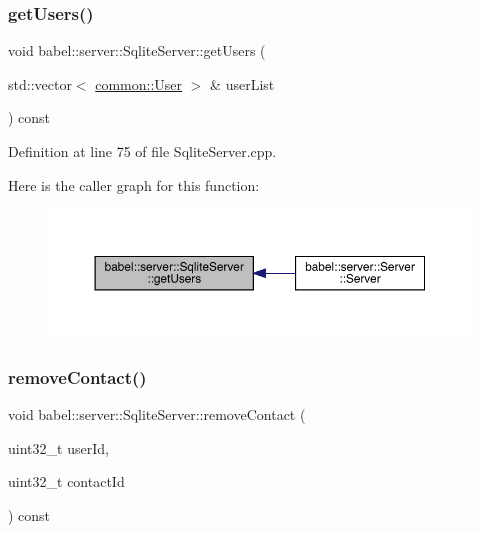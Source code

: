 \subsubsection{\texorpdfstring{get\+Users()}{getUsers()}}
{\footnotesize\ttfamily void babel\+::server\+::\+Sqlite\+Server\+::get\+Users (\begin{DoxyParamCaption}\item[{std\+::vector$<$ \mbox{\hyperlink{classbabel_1_1common_1_1_user}{common\+::\+User}} $>$ \&}]{user\+List }\end{DoxyParamCaption}) const}



Definition at line 75 of file Sqlite\+Server.\+cpp.

Here is the caller graph for this function\+:\nopagebreak
\begin{figure}[H]
\begin{center}
\leavevmode
\includegraphics[width=350pt]{classbabel_1_1server_1_1_sqlite_server_ac0e58c4ae276fc3c52b7205a5098a75c_icgraph}
\end{center}
\end{figure}
\mbox{\label{classbabel_1_1server_1_1_sqlite_server_a526fe31d577c1227af6ed92ee6f65bd6}} 
\subsubsection{\texorpdfstring{remove\+Contact()}{removeContact()}}
{\footnotesize\ttfamily void babel\+::server\+::\+Sqlite\+Server\+::remove\+Contact (\begin{DoxyParamCaption}\item[{uint32\+\_\+t}]{user\+Id,  }\item[{uint32\+\_\+t}]{contact\+Id }\end{DoxyParamCaption}) const}



